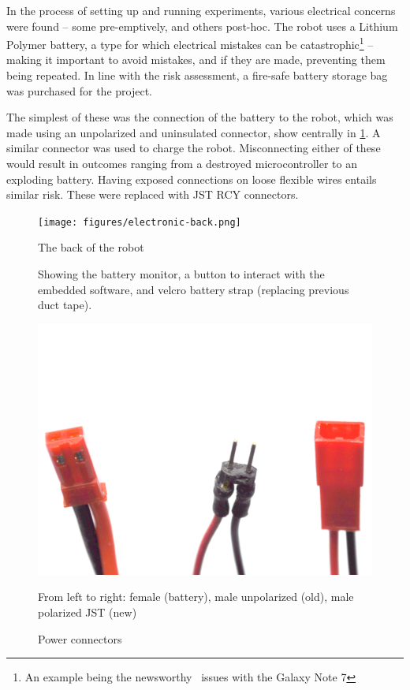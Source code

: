 \documentclass[main.tex]{subfiles}
\begin{document}
In the process of setting up and running experiments, various electrical concerns were found -- some pre-emptively, and others post-hoc. The robot uses a Lithium Polymer battery, a type for which electrical mistakes can be catastrophic\footnote{An example being the newsworthy~\cite{bbc-samsung-explosion} issues with the Galaxy Note 7} -- making it important to avoid mistakes, and if they are made, preventing them being repeated. In line with the risk assessment, a fire-safe battery storage bag was purchased for the project.

The simplest of these was the connection of the battery to the robot, which was made using an unpolarized and uninsulated connector, show centrally in \cref{fig:connectors}. A similar connector was used to charge the robot. Misconnecting either of these would result in outcomes ranging from a destroyed microcontroller to an exploding battery. Having exposed connections on loose flexible wires entails similar risk. These were replaced with JST RCY connectors.

\begin{figure}
	\begin{minipage}[t]{0.6\linewidth - 1em}
		\centering
		\texttt{[image: figures/electronic-back.png]}
		\caption{The back of the robot}
		\label{fig:robot-back}
		\medskip
		\small
		Showing the battery monitor, a button to interact with the embedded software, and velcro battery strap
		(replacing previous duct tape).
	\end{minipage}\hfill
	\begin{minipage}[t]{0.4\linewidth - 1em}
		\centering
		\includegraphics[width=\linewidth]{figures/battery-connectors.png}
		\caption{Power connectors}
		\label{fig:connectors}
		\medskip
		\small
		From left to right: female (battery), male unpolarized (old), male polarized JST (new)
	\end{minipage}
\end{figure}
\end{document}
